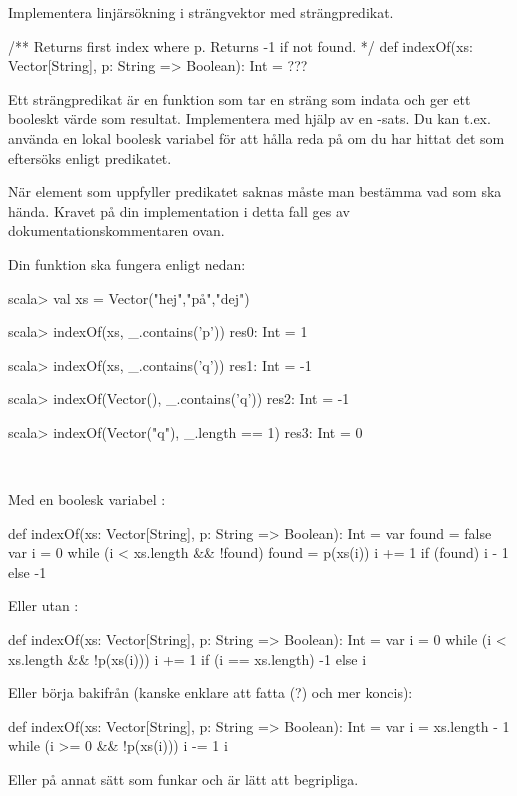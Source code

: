 \Subtask Implementera linjärsökning i strängvektor med strängpredikat.
\begin{Code}
/** Returns first index where p. Returns -1 if not found. */
def indexOf(xs: Vector[String], p: String => Boolean): Int = ???
\end{Code}
Ett strängpredikat  är en funktion som tar en sträng som indata och ger ett booleskt värde som resultat. Implementera  med hjälp av en -sats. Du kan t.ex. använda en lokal boolesk variabel  för att hålla reda på om du har hittat det som eftersöks enligt predikatet.

När element som uppfyller predikatet saknas måste man bestämma vad som ska hända. Kravet på din implementation i detta fall ges av dokumentationskommentaren ovan.

Din funktion ska fungera enligt nedan:
\begin{REPL}
scala> val xs = Vector("hej","på","dej")

scala> indexOf(xs, _.contains('p'))
res0: Int = 1

scala> indexOf(xs, _.contains('q'))
res1: Int = -1

scala> indexOf(Vector(), _.contains('q'))
res2: Int = -1

scala> indexOf(Vector("q"), _.length == 1)
res3: Int = 0
\end{REPL}

\SOLUTION

\TaskSolved \what~

\SubtaskSolved

\begin{ConceptConnections}

\end{ConceptConnections}

\SubtaskSolved Med en boolesk variabel :

\begin{Code}
def indexOf(xs: Vector[String], p: String => Boolean): Int = {
  var found = false
  var i = 0
  while (i < xs.length && !found) {
      found = p(xs(i))
      i += 1
  }
  if (found) i - 1 else -1
}
\end{Code}
Eller utan :
\begin{Code}
def indexOf(xs: Vector[String], p: String => Boolean): Int = {
  var i = 0
  while (i < xs.length && !p(xs(i))) i += 1
  if (i == xs.length) -1 else i
}
\end{Code}
Eller börja bakifrån (kanske enklare att fatta (?) och mer koncis):
\begin{Code}
def indexOf(xs: Vector[String], p: String => Boolean): Int = {
  var i = xs.length - 1
  while (i >= 0 && !p(xs(i))) i -= 1
  i
}
\end{Code}
Eller på annat sätt som funkar och är lätt att begripliga.

